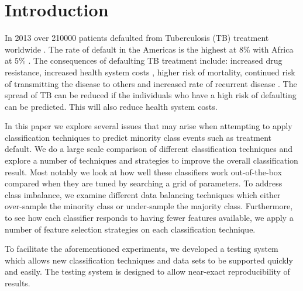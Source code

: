 \documentclass{sig-alternate-05-2015}
\begin{document}
	\maketitle
	\begin{abstract}
	\end{abstract}
	
	\printccsdesc
	
	
	
	\section{Introduction}	
	In 2013 over 210\hspace*{1mm}000 patients defaulted from Tuberculosis (TB) treatment worldwide \cite{world2015TB}. The rate of default in the Americas is the highest at 8\% with Africa at 5\% \cite{world2015TB}. The consequences of defaulting TB treatment include: increased drug resistance, increased health system costs \cite{Lackey:10356751520150601, muture:6660173120110101}, higher risk of mortality, continued risk of transmitting the disease to others \cite{Lackey:10356751520150601} and increased rate of recurrent disease \cite{Jha:10.1371/journal.pone.0008873}. The spread of TB can be reduced if the individuals who have a high risk of defaulting can be predicted. This will also reduce health system costs.
	
	In this paper we explore several issues that may arise when attempting to apply classification techniques to predict minority class events such as treatment default. We do a large scale comparison of different classification techniques and explore a number of techniques and strategies to improve the overall classification result. Most notably we look at how well these classifiers work out-of-the-box compared when they are tuned by searching a grid of parameters. To address class imbalance, we examine different data balancing techniques which either over-sample the minority class or under-sample the majority class. Furthermore, to see how each classifier responds to having fewer features available, we apply a number of feature selection strategies on each classification technique.
	
	To facilitate the aforementioned experiments, we developed a testing system which allows new classification techniques and data sets to be supported quickly and easily. The testing system is designed to allow near-exact reproducibility of results.
	
\end{document}
